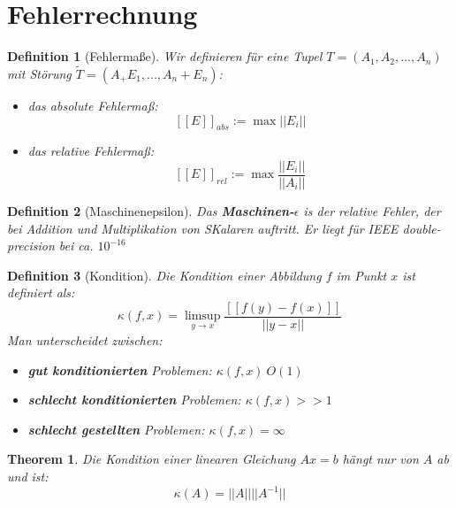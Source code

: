 \documentclass[10pt,a4paper]{article}
\newtheorem{theorem}{Theorem}
\newtheorem{definition}{Definition}
\begin{document}
	\section{Fehlerrechnung}
	\begin{definition}[Fehlermaße]
		Wir definieren für eine Tupel $T= (A_1, A_2, ..., A_n)$ mit Störung $\tilde{T}=(A_+E_1, ..., A_n+E_n)$:
		\begin{itemize}
			\item das absolute Fehlermaß:
			$$[[E]]_{abs} := \max||E_i||$$
			\item das relative Fehlermaß:
			$$[[E]]_{rel}:= \max\frac{||E_i||}{||A_i||}$$
		\end{itemize}
	\end{definition}
	\begin{definition}[Maschinenepsilon]
		Das \textbf{Maschinen-$\epsilon$} is der relative Fehler, der bei Addition und Multiplikation von SKalaren auftritt. Er liegt für IEEE double-precision bei ca. $10^{-16}$
	\end{definition}
	\begin{definition}[Kondition]
		Die Kondition einer Abbildung $f$ im Punkt $x$ ist definiert als:
		$$\kappa(f, x) = \limsup_{y\to x}\frac{[[f(y)-f(x)]]}{||y-x||}$$
		Man unterscheidet zwischen:
		\begin{itemize}
			\item \textbf{gut konditionierten} Problemen: $\kappa(f,x) ~ O(1)$
			\item \textbf{schlecht konditionierten} Problemen: $\kappa(f, x) >> 1$
			\item \textbf{schlecht gestellten} Problemen: $\kappa(f, x) = \infty$
		\end{itemize}
	\end{definition}
	\begin{theorem}
		Die Kondition einer linearen Gleichung $Ax= b$ hängt nur von $A$ ab und ist:
		$$\kappa(A) = ||A||||A^{-1}||$$
	\end{theorem}
\end{document}

